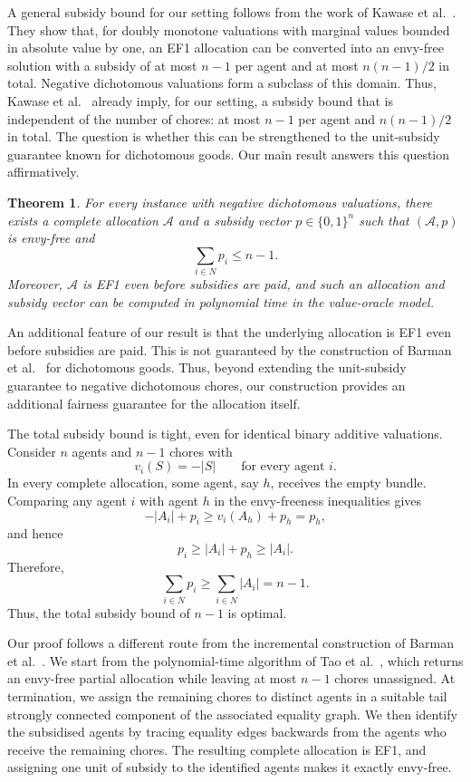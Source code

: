 \documentclass[sigconf,anonymous]{aamas}
\theoremstyle{acmplain}
\newtheorem*{theorem*}{Theorem}
\theoremstyle{acmdefinition}
\theoremstyle{acmplain}
\begin{document}
A general subsidy bound for our setting follows from the work of Kawase et al.~\cite{kawase2025towards}. They show that, for doubly monotone valuations with marginal values bounded in absolute value by one, an EF1 allocation can be converted into an envy-free solution with a subsidy of at most $n-1$ per agent and at most $n(n-1)/2$ in total. Negative dichotomous valuations form a subclass of this domain. Thus, Kawase et al.~\cite{kawase2025towards} already imply, for our setting, a subsidy bound that is independent of the number of chores: at most $n-1$ per agent and $n(n-1)/2$ in total. The question is whether this can be strengthened to the unit-subsidy guarantee known for dichotomous goods. Our main result answers this question affirmatively.

\begin{theorem*}
For every instance with negative dichotomous valuations, there exists a complete allocation $\mathcal A$ and a subsidy vector
$p\in\{0,1\}^n$ such that $(\mathcal A,p)$ is envy-free and
\[
    \sum_{i\in N} p_i\le n-1.
\]
Moreover, $\mathcal A$ is EF1 even before subsidies are paid, and such an allocation and subsidy vector can be computed in polynomial time in the value-oracle model.
\end{theorem*}
An additional feature of our result is that the underlying allocation is EF1 even before subsidies are paid. This is not guaranteed by the construction of Barman et al.~\cite{BKNS22} for dichotomous goods. Thus, beyond extending the unit-subsidy guarantee to negative dichotomous chores, our construction provides an additional fairness guarantee for the allocation itself.

The total subsidy bound is tight, even for identical binary additive
valuations. Consider $n$ agents and $n-1$ chores with
\[
v_i(S)=-|S|
\qquad\text{for every agent }i.
\]
In every complete allocation, some agent, say $h$, receives the empty bundle. Comparing any agent $i$ with agent $h$ in the envy-freeness
inequalities gives
\[
-|A_i|+p_i
\ge v_i(A_h)+p_h
= p_h,
\]
and hence
\[
p_i\ge |A_i|+p_h\ge |A_i|.
\]
Therefore,
\[
\sum_{i\in N}p_i
\ge
\sum_{i\in N}|A_i|
=
n-1.
\]
Thus, the total subsidy bound of \(n-1\) is optimal.

Our proof follows a different route from the incremental construction of Barman et al.~\cite{BKNS22}. We start from the polynomial-time algorithm of Tao et al.~\cite{tao2025existence}, which returns an envy-free partial allocation while leaving at most $n-1$ chores unassigned. At termination, we assign the remaining chores to distinct agents in a suitable tail strongly connected component of the associated equality graph. We then identify the subsidised agents by tracing equality edges backwards from the agents who receive the remaining chores. The resulting complete allocation is EF1, and assigning one unit of subsidy to the identified agents makes it exactly envy-free.
\end{document}
